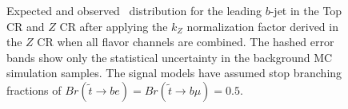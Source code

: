 \begin{figure}[p]
  \centering
  \caption[
    Expected and observed \pt\ distribution for the leading $b$-jet in
    the Top CR and $Z$ CR after applying the $k_Z$ normalization factor derived
    in the $Z$ CR when all flavor channels are combined.
  ]{
    Expected and observed \pt\ distribution for the leading $b$-jet in
    the Top CR and $Z$ CR after applying the $k_Z$ normalization factor derived
    in the $Z$ CR when all flavor channels are combined.
    The hashed error bands show only the statistical uncertainty in the
    background MC simulation samples.
    The signal models have assumed stop branching fractions of
    $Br(\tilde{t}\rightarrow be) = Br(\tilde{t}\rightarrow b\mu) = 0.5$.
  }
  \label{fig:cr_b_jet_pt_0__w_norm_factor}
\end{figure}

